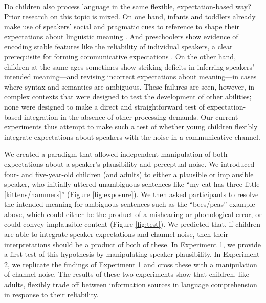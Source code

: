 \documentclass[man,floatsintext]{apa6}
\begin{document}
Do children also process language in the same flexible, expectation-based way? Prior research on this topic is mixed. On one hand, infants and toddlers already make use of speakers' social and pragmatic cues to reference to shape their expectations about linguistic meaning \cite{clark2009, carpenter1998}. And preschoolers show evidence of encoding stable features like the reliability of individual speakers, a clear prerequisite for forming communicative expectations \cite{koenig2004, harris2012}. On the other hand, children at the same ages sometimes show striking deficits in inferring speakers' intended meaning---and revising incorrect expectations about meaning---in cases where syntax \cite{trueswell1999} and semantics \cite{noveck2001} are ambiguous. These failures are seen, however, in complex contexts that were designed to test the development of other abilities; none were designed to make a direct and straightforward test of expectation-based integration in the absence of other processing demands. Our current experiments thus attempt to make such a test of whether young children flexibly integrate expectations about speakers with the noise in a communicative channel. 

We created a paradigm that allowed independent manipulation of both expectations about a speaker's plausibility and perceptual noise. We introduced four- and five-year-old children (and adults) to either a plausible or implausible speaker, who initially uttered unambiguous sentences like ``my cat has three little [kittens/hammers]'' (Figure \ref{fig:exposure}). We then asked participants to resolve the intended meaning for ambiguous sentences such as the ``bees/peas'' example above, which could either be the product of a mishearing or phonological error, or could convey implausible content (Figure \ref{fig:test}). We predicted that, if children are able to integrate speaker expectations and channel noise, then their interpretations should be a product of both of these. In Experiment 1, we provide a first test of this hypothesis by manipulating speaker plausibility. In Experiment 2, we replicate the findings of Experiment 1 and cross these with a manipulation of channel noise. The results of these two experiments show that children, like adults, flexibly trade off between information sources in language comprehension in response to their reliability.
\end{document}
